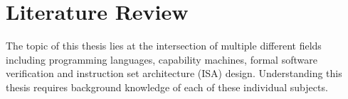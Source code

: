 \chapter{Literature Review}
\label{cha:litrev}
The topic of this thesis lies at the intersection of multiple different fields including programming languages, capability machines, formal software verification and instruction set architecture (ISA) design. Understanding this thesis requires background knowledge of each of these individual subjects.



%
%

